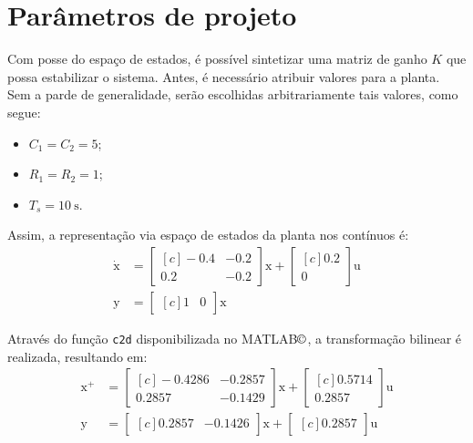 \section{Parâmetros de projeto}
Com posse do espaço de estados, é possível sintetizar uma matriz de ganho $K$ que possa estabilizar o sistema. Antes, é necessário atribuir valores para a planta. Sem a parde de generalidade, serão escolhidas arbitrariamente tais valores, como segue:
\begin{itemize}
  \item $C_1 = C_2 = 5$;
  \item $R_1 = R_2 = 1$;
  \item $T_s = \SI{10}{\second}$.
\end{itemize}

Assim, a representação via espaço de estados da planta nos contínuos é:
\begin{subequations}
  \begin{align}
    \dot{\pmb{\mathrm{x}}} &= \begin{bmatrix*}[c]
      -0.4 & -0.2\\
      0.2 & -0.2
    \end{bmatrix*}\pmb{\mathrm{x}} + \begin{bmatrix*}[c]
      0.2\\
      0
    \end{bmatrix*}\pmb{\mathrm{u}}\label{eq:SSCTCEntrada}\\
    \pmb{\mathrm{y}} &= \begin{bmatrix*}[c]
      1 & 0
    \end{bmatrix*}\pmb{\mathrm{x}}\label{eq:SSCTCSaida}
  \end{align}
\end{subequations}

Através do função \texttt{c2d} disponibilizada no MATLAB$\copyright$\cite{MATLAB}, a transformação bilinear é realizada, resultando em:
\begin{subequations}
  \begin{align}
    \pmb{\mathrm{x^{+}}} &= \begin{bmatrix*}[c]
      -0.4286 & -0.2857\\
      0.2857 & -0.1429
    \end{bmatrix*}\pmb{\mathrm{x}} + \begin{bmatrix*}[c]
      0.5714\\
      0.2857
    \end{bmatrix*}\pmb{\mathrm{u}}\label{eq:SSDTCEntrada}\\
    \pmb{\mathrm{y}} &= \begin{bmatrix*}[c]
      0.2857 & -0.1426
    \end{bmatrix*}\pmb{\mathrm{x}} + \begin{bmatrix*}[c]
      0.2857
    \end{bmatrix*}\pmb{\mathrm{u}}\label{eq:SSDTCSaida}
  \end{align}
\end{subequations}

